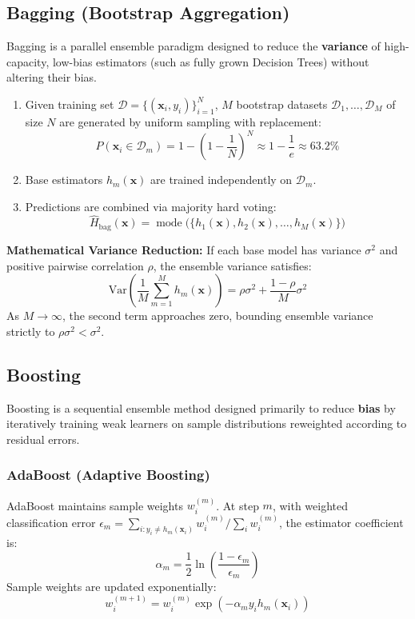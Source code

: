 \documentclass[12pt,a4paper]{article}
\begin{document}
\subsection{Bagging (Bootstrap Aggregation)}
Bagging is a parallel ensemble paradigm designed to reduce the \textbf{variance} of high-capacity, low-bias estimators (such as fully grown Decision Trees) without altering their bias.
\begin{enumerate}
    \item Given training set $\mathcal{D} = \{(\mathbf{x}_i, y_i)\}_{i=1}^N$, $M$ bootstrap datasets $\mathcal{D}_1, \dots, \mathcal{D}_M$ of size $N$ are generated by uniform sampling with replacement:
    \begin{equation}
    P(\mathbf{x}_i \in \mathcal{D}_m) = 1 - \left(1 - \frac{1}{N}\right)^N \approx 1 - \frac{1}{e} \approx 63.2\%
    \end{equation}
    \item Base estimators $h_m(\mathbf{x})$ are trained independently on $\mathcal{D}_m$.
    \item Predictions are combined via majority hard voting:
    \begin{equation}
    \hat{H}_{\text{bag}}(\mathbf{x}) = \operatorname{mode}\Big(\{h_1(\mathbf{x}), h_2(\mathbf{x}), \dots, h_M(\mathbf{x})\}\Big)
    \end{equation}
\end{enumerate}

\textbf{Mathematical Variance Reduction:} If each base model has variance $\sigma^2$ and positive pairwise correlation $\rho$, the ensemble variance satisfies:
\begin{equation}
\text{Var}\left(\frac{1}{M}\sum_{m=1}^M h_m(\mathbf{x})\right) = \rho \sigma^2 + \frac{1 - \rho}{M} \sigma^2
\end{equation}
As $M \to \infty$, the second term approaches zero, bounding ensemble variance strictly to $\rho \sigma^2 < \sigma^2$.

\subsection{Boosting}
Boosting is a sequential ensemble method designed primarily to reduce \textbf{bias} by iteratively training weak learners on sample distributions reweighted according to residual errors.

\subsubsection{AdaBoost (Adaptive Boosting)}
AdaBoost maintains sample weights $w_i^{(m)}$. At step $m$, with weighted classification error $\epsilon_m = \sum_{i: y_i \neq h_m(\mathbf{x}_i)} w_i^{(m)} / \sum_i w_i^{(m)}$, the estimator coefficient is:
\begin{equation}
\alpha_m = \frac{1}{2} \ln \left( \frac{1 - \epsilon_m}{\epsilon_m} \right)
\end{equation}
Sample weights are updated exponentially:
\begin{equation}
w_i^{(m+1)} = w_i^{(m)} \exp\left(-\alpha_m y_i h_m(\mathbf{x}_i)\right)
\end{equation}
\end{document}
